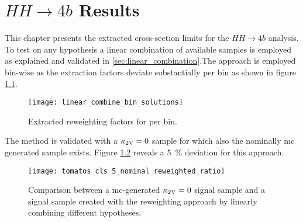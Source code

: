 \chapter{$HH\rightarrow 4b$ Results}\label{ch:hh4b-results}

This chapter presents the extracted cross-section limits for the $HH\rightarrow 4b$ analysis. 
To test on any \ktwov hypothesis a linear combination of available samples is employed as explained and validated in \ref{sec:linear_combination}.The approach is employed bin-wise as the extraction factors deviate substantially per bin as shown in figure \ref{fig:linear_combine_bin_solutions}.
\begin{figure}
    \centering
    \texttt{[image: linear\_combine\_bin\_solutions]}
    \caption[]{Extracted reweighting factors for  per bin.}
    \label{fig:linear_combine_bin_solutions}
\end{figure}
The method is validated with a $\kappa_{\text{2V}}=0$ sample for which also the nominally mc generated sample exists. Figure \ref{fig:tomatos_cls_5_nominal_reweighted_ratio} reveals a \qty[]{5}{\percent} deviation for this approach.  
\begin{figure}
    \centering
    \texttt{[image: tomatos\_cls\_5\_nominal\_reweighted\_ratio]}
    \caption[]{Comparison between a \ac{mc}-generated $\kappa_{\text{2V}}=0$ signal sample and a signal sample created with the reweighting approach by linearly combining different \ktwov hypotheses. }
    \label{fig:tomatos_cls_5_nominal_reweighted_ratio}
\end{figure}


\begin{landscape}
    \begin{figure}
        \centering
        \caption[]{}
        \label{fig:k2v_scan_limits_overlay}
    \end{figure}
\end{landscape}


